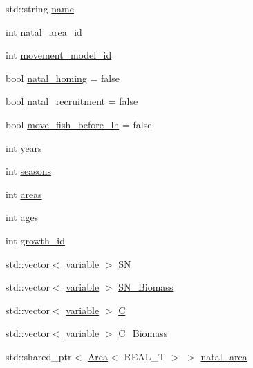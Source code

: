 \begin{DoxyCompactItemize}
\item 
std\-::string \hyperlink{classmas_1_1_population_a44500e45226461f286df00fc98b354cb}{name}
\item 
int \hyperlink{classmas_1_1_population_a035dfbc2bc4a4c379cd1ea272d58d103}{natal\-\_\-area\-\_\-id}
\item 
int \hyperlink{classmas_1_1_population_a445c1fbf6d76206a93b243f7e39b8279}{movement\-\_\-model\-\_\-id}
\item 
bool \hyperlink{classmas_1_1_population_a851c5669637dc6d7333b9f5124a7f867}{natal\-\_\-homing} = false
\item 
bool \hyperlink{classmas_1_1_population_add42454aa09f82776039538f7b87a2c9}{natal\-\_\-recruitment} = false
\item 
bool \hyperlink{classmas_1_1_population_a94c79dddb366eb6702f4a2cfd77c3eb8}{move\-\_\-fish\-\_\-before\-\_\-lh} = false
\item 
int \hyperlink{classmas_1_1_population_a3c5b11c403479bdc518727551791ed21}{years}
\item 
int \hyperlink{classmas_1_1_population_a3ff65a37b33f558530ed8fa065d79eb6}{seasons}
\item 
int \hyperlink{classmas_1_1_population_a5dbc73c77f78382e1d7dadfa1b24dfb8}{areas}
\item 
int \hyperlink{classmas_1_1_population_a0012e4e055a3a2c661097ae30a4c18e7}{ages}
\item 
int \hyperlink{classmas_1_1_population_a2720b3c93f0fc25a600dd37becebd3d7}{growth\-\_\-id}
\item 
std\-::vector$<$ \hyperlink{classmas_1_1_population_a55b9219455246e0cab7f84ae49f0271f}{variable} $>$ \hyperlink{classmas_1_1_population_ad305739a2b90cd6947b4f847a0de46eb}{S\-N}
\item 
std\-::vector$<$ \hyperlink{classmas_1_1_population_a55b9219455246e0cab7f84ae49f0271f}{variable} $>$ \hyperlink{classmas_1_1_population_ad41f0a54ab4be79a144b1b61a5fe7436}{S\-N\-\_\-\-Biomass}
\item 
std\-::vector$<$ \hyperlink{classmas_1_1_population_a55b9219455246e0cab7f84ae49f0271f}{variable} $>$ \hyperlink{classmas_1_1_population_a878a062c7c1cb82ad02c0f42417c072c}{C}
\item 
std\-::vector$<$ \hyperlink{classmas_1_1_population_a55b9219455246e0cab7f84ae49f0271f}{variable} $>$ \hyperlink{classmas_1_1_population_ad3554c8cd3320e57770a1f793359c62f}{C\-\_\-\-Biomass}
\item 
std\-::shared\-\_\-ptr$<$ \hyperlink{structmas_1_1_area}{Area}$<$ R\-E\-A\-L\-\_\-\-T $>$ $>$ \hyperlink{classmas_1_1_population_a5ce5f6317dd632ccbf1961d0b0eca4d6}{natal\-\_\-area}

\end{DoxyCompactItemize}
